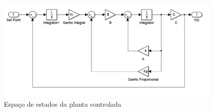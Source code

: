 \begin{figure}[H]
	\begin{centering}
		\includegraphics[width=\textwidth]{img/modelo_controlado.png}
		\par\end{centering}
	\caption{\label{figSimPlantCtrl}Espaço de estados da planta controlada}
\end{figure}

%

